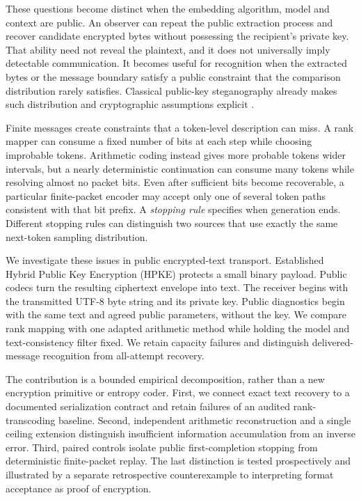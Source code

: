 \documentclass[a4paper,twoside]{article}
\begin{document}
These questions become distinct when the embedding algorithm, model and context are public. An observer can repeat the public extraction process and recover candidate encrypted bytes without possessing the recipient's private key. That ability need not reveal the plaintext, and it does not universally imply detectable communication. It becomes useful for recognition when the extracted bytes or the message boundary satisfy a public constraint that the comparison distribution rarely satisfies. Classical public-key steganography already makes such distribution and cryptographic assumptions explicit \cite{vonahn2004public}.

Finite messages create constraints that a token-level description can miss. A rank mapper can consume a fixed number of bits at each step while choosing improbable tokens. Arithmetic coding instead gives more probable tokens wider intervals, but a nearly deterministic continuation can consume many tokens while resolving almost no packet bits. Even after sufficient bits become recoverable, a particular finite-packet encoder may accept only one of several token paths consistent with that bit prefix. A \emph{stopping rule} specifies when generation ends. Different stopping rules can distinguish two sources that use exactly the same next-token sampling distribution.

We investigate these issues in public encrypted-text transport. Established Hybrid Public Key Encryption (HPKE) protects a small binary payload. Public codecs turn the resulting ciphertext envelope into text. The receiver begins with the transmitted UTF-8 byte string and its private key. Public diagnostics begin with the same text and agreed public parameters, without the key. We compare rank mapping with one adapted arithmetic method while holding the model and text-consistency filter fixed. We retain capacity failures and distinguish delivered-message recognition from all-attempt recovery.

The contribution is a bounded empirical decomposition, rather than a new encryption primitive or entropy coder. First, we connect exact text recovery to a documented serialization contract and retain failures of an audited rank-transcoding baseline. Second, independent arithmetic reconstruction and a single ceiling extension distinguish insufficient information accumulation from an inverse error. Third, paired controls isolate public first-completion stopping from deterministic finite-packet replay. The last distinction is tested prospectively and illustrated by a separate retrospective counterexample to interpreting format acceptance as proof of encryption.
\end{document}
